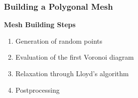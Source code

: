 \begin{frame} %
    \frametitle{Building a Polygonal Mesh}

    \vspace*{\fill}
    \begin{multicols}{2}
        
        \vspace*{\fill}
        \begin{center}
            {\color{\accentcolor} \Large \textbf{Mesh Building Steps}}
            \vspace*{0.5cm}

            \begin{minipage}{0.4\textwidth}
                \begin{enumerate}
                    \item Generation of random points
                    \item {\color{\accentcolor} Evaluation of the first Voronoi diagram}
                    \item Relaxation through Lloyd's algorithm
                    \item Postprocessing
                \end{enumerate}
            \end{minipage}
        \end{center}
        \vspace*{\fill}

        \vfill\null
        \columnbreak

        \vspace*{\fill}
        \begin{figure}[!ht]
            \centering
            
        \end{figure}
        \vspace*{\fill}

    \end{multicols}
    \vspace*{\fill}
    
\end{frame}

